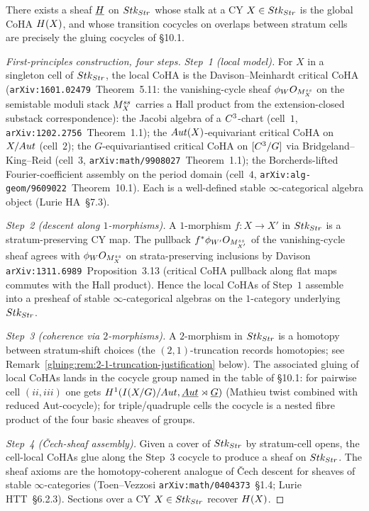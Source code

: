 \begin{theorem}
\label{gluing:thm:sheaf-of-cohas}
There exists a sheaf $\underline{H}$ on $Stk_{Str}$ whose stalk at
a CY $X\in Stk_{Str}$ is the global CoHA $H(X)$, and whose
transition cocycles on overlaps between stratum cells are precisely the
gluing cocycles of \S 10.1.
\end{theorem}

\begin{proof}[First-principles construction, four steps]
\emph{Step~1 (local model).} For $X$ in a singleton cell of
$Stk_{Str}$, the local CoHA is the Davison--Meinhardt critical CoHA
(\texttt{arXiv:1601.02479}~Theorem~5.11: the vanishing-cycle sheaf
$\phi_{W}O_{M^{ss}_{X}}$ on the semistable moduli stack
$M^{ss}_{X}$ carries a Hall product from the extension-closed
substack correspondence): the Jacobi algebra of a $C^{3}$-chart
(cell~$1$, \texttt{arXiv:1202.2756}~Theorem~1.1); the
$Aut(X)$-equivariant critical CoHA on $X/Aut$ (cell~$2$); the
$G$-equivariantised critical CoHA on $[C^{3}/G]$ via
Bridgeland--King--Reid (cell~$3$,
\texttt{arXiv:math/9908027}~Theorem~1.1); the Borcherds-lifted
Fourier-coefficient assembly on the period domain (cell~$4$,
\texttt{arXiv:alg-geom/9609022}~Theorem~10.1). Each is a well-defined
stable $\infty$-categorical algebra object (Lurie HA~\S 7.3).

\emph{Step~2 (descent along $1$-morphisms).} A $1$-morphism
$f:X\to X'$ in $Stk_{Str}$ is a stratum-preserving CY map. The
pullback $f^{*}\phi_{W'}O_{M^{ss}_{X'}}$ of the vanishing-cycle
sheaf agrees with $\phi_{W}O_{M^{ss}_{X}}$ on strata-preserving
inclusions by Davison \texttt{arXiv:1311.6989}~Proposition~3.13
(critical CoHA pullback along flat maps commutes with the Hall
product). Hence the local CoHAs of Step~$1$ assemble into a presheaf
of stable $\infty$-categorical algebras on the $1$-category underlying
$Stk_{Str}$.

\emph{Step~3 (coherence via $2$-morphisms).} A $2$-morphism in
$Stk_{Str}$ is a homotopy between stratum-shift choices (the
$(2,1)$-truncation records homotopies; see
Remark~\ref{gluing:rem:2-1-truncation-justification} below). The
associated gluing of local CoHAs lands in the cocycle group named in
the table of \S 10.1: for pairwise cell $(ii,iii)$ one gets
$H^{1}(I(X/G)/Aut,\underline{Aut}\rtimes\underline{G})$ (Mathieu
twist combined with reduced Aut-cocycle); for triple/quadruple cells
the cocycle is a nested fibre product of the four basic sheaves of
groups.

\emph{Step~4 (\v{C}ech-sheaf assembly).} Given a cover of $Stk_{Str}$
by stratum-cell opens, the cell-local CoHAs glue along the Step~$3$
cocycle to produce a sheaf on $Stk_{Str}$. The sheaf axioms are the
homotopy-coherent analogue of \v{C}ech descent for sheaves of stable
$\infty$-categories (Toen--Vezzosi \texttt{arXiv:math/0404373}~\S 1.4;
Lurie HTT~\S 6.2.3). Sections over a CY $X\in Stk_{Str}$ recover
$H(X)$.
\end{proof}

